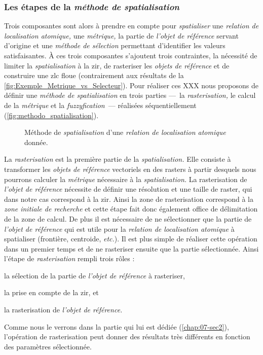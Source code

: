 \subsubsection{Les étapes de la \emph{méthode de spatialisation}}

Trois composantes sont alors à prendre en compte pour
\emph{spatialiser} une \emph{relation de localisation atomique,} une
\emph{métrique,} la partie de \emph{l'objet de référence} servant
d'origine et une \emph{méthode de sélection} permettant d'identifier
les valeurs satisfaisantes.
%
À ces trois composantes s'ajoutent trois contraintes, la nécessité de
limiter la \emph{spatialisation} à la \ac{zir}, de rasteriser les
\emph{objets de référence} et de construire une \ac{zlc} floue
(contrairement aux résultats de la
\autoref{fig:Exemple_Metrique_vs_Selecteur}).
%
Pour réaliser ces XXX nous proposons de définir une \emph{méthode de
  spatialisation} en trois parties ---~la \emph{rasterisation,} le
calcul de la \emph{métrique} et la \emph{fuzzyfication}~--- réalisées
séquentiellement (\autoref{fig:methodo_spatialisation}).

\begin{figure}
  \centering
  
  \caption{Méthode de \emph{spatialisation} d'une \emph{relation de
      localisation atomique} donnée.}
  \label{fig:methodo_spatialisation}
\end{figure}

La \emph{rasterisation} est la première partie de la
\emph{spatialisation.} Elle consiste à transformer les \emph{objets de
  référence} vectoriels en des rasters à partir desquels nous pourrons
calculer la \emph{métrique} nécessaire à la \emph{spatialisation.} La
rasterisation de \emph{l'objet de référence} nécessite de définir une
résolution et une taille de raster, qui dans notre cas correspond à la
\ac{zir}. Ainsi la zone de rasterisation correspond à la \emph{zone
  initiale de recherche} et cette étape fait donc également office de
délimitation de la zone de calcul. De plus il est nécessaire de ne
sélectionner que la partie de \emph{l'objet de référence} qui est
utile pour la \emph{relation de localisation atomique} à spatialiser
(\eg frontière, centroide, \emph{etc.}). Il est plus simple de
réaliser cette opération dans un premier temps et de ne rasteriser
ensuite que la partie sélectionnée. Ainsi l'étape de
\emph{rasterisation} rempli trois rôles :
%
\begin{enumerate*}[label=(\alph*)]
\item la sélection de la partie de \emph{l'objet de référence} à rasteriser,
\item la prise en compte de la \ac{zir}, et
\item la rasterisation de \emph{l'objet de référence.}  
\end{enumerate*}
%
Comme nous le verrons dans la partie qui lui est dédiée
(\autoref{chap:07-sec2}), l'opération de rasterisation peut donner des
résultats très différents en fonction des paramètres sélectionnée.

